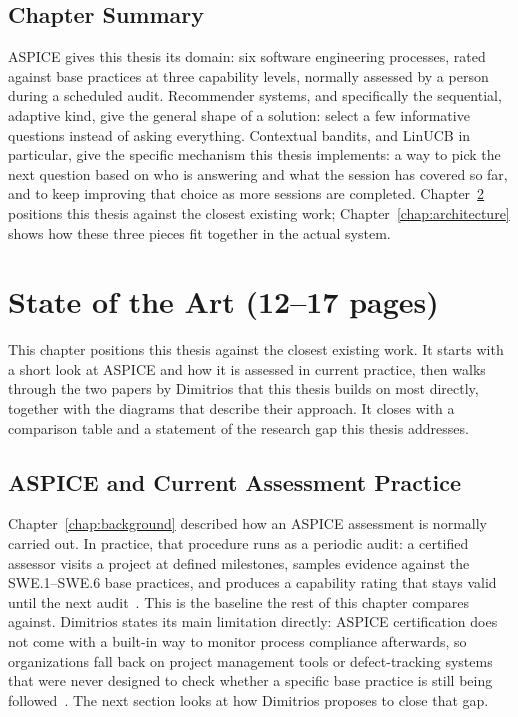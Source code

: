 \documentclass[a4paper, 12pt, oneside, openany, BCOR1cm,toc=chapterentrywithdots]{scrbook}
\begin{document}
\section{Chapter Summary}

ASPICE gives this thesis its domain: six software engineering processes, rated against base
practices at three capability levels, normally assessed by a person during a scheduled audit.
Recommender systems, and specifically the sequential, adaptive kind, give the general shape of a
solution: select a few informative questions instead of asking everything. Contextual bandits,
and LinUCB in particular, give the specific mechanism this thesis implements: a way to pick the
next question based on who is answering and what the session has covered so far, and to keep
improving that choice as more sessions are completed. Chapter~\ref{chap:sota} positions this
thesis against the closest existing work; Chapter~\ref{chap:architecture} shows how these three
pieces fit together in the actual system.

\chapter{State of the Art (12--17 pages)}
\label{chap:sota}
% 

This chapter positions this thesis against the closest existing work. It starts with a short
look at ASPICE and how it is assessed in current practice, then walks through the two papers by
Dimitrios that this thesis builds on most directly, together with the diagrams that describe
their approach. It closes with a comparison table and a statement of the research gap this
thesis addresses.

\section{ASPICE and Current Assessment Practice}

Chapter~\ref{chap:background} described how an ASPICE assessment is normally carried out. In
practice, that procedure runs as a periodic audit: a certified assessor visits a project at
defined milestones, samples evidence against the SWE.1--SWE.6 base practices, and produces a
capability rating that stays valid until the next
audit~\cite{vdaqmc2023pam,murphy_aspice_0to60}. This is the baseline the rest of this chapter
compares against. Dimitrios states its main limitation directly: ASPICE certification does
not come with a built-in way to monitor process compliance afterwards, so organizations fall
back on project management tools or defect-tracking systems that were never designed to check
whether a specific base practice is still being followed~\cite{datsogiannis2024early}. The next
section looks at how Dimitrios proposes to close that gap.
\end{document}
